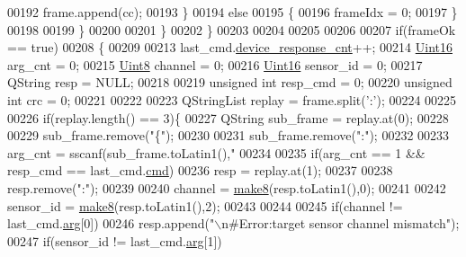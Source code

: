 \begin{DoxyCode}
{00192                                        frame.append(cc);
00193                                    \}
00194                                    \textcolor{keywordflow}{else}
00195                                    \{
00196                                        frameIdx = 0;
00197                                    \}
00198 
00199                       \}
00200 
00201                  \}
00202             \}
00203        
00204 
00205 
00206 
00207         \textcolor{keywordflow}{if}(frameOk == \textcolor{keyword}{true})
00208         \{
00209 
00213             last\_cmd.\hyperlink{a00001_a2b37e66e2555cf1dc26439ad7c30ea78}{device\_response\_cnt}++;
00214             \hyperlink{a00001_aae7407b021d43f7193a81a58cfb3e297}{Uint16}  arg\_cnt      =   0;
00215             \hyperlink{a00001_a979e3e23b9a449e69ab6a8a83b6042f8}{Uint8}   channel      =   0;
00216             \hyperlink{a00001_aae7407b021d43f7193a81a58cfb3e297}{Uint16}  sensor\_id    =   0;
00217             QString resp         =   NULL;
00218 
00219             \textcolor{keywordtype}{unsigned} \textcolor{keywordtype}{int}  resp\_cmd     =   0;
00220             \textcolor{keywordtype}{unsigned} \textcolor{keywordtype}{int}  crc          =   0;
00221 
00222 
00223           QStringList replay     = frame.split(\textcolor{charliteral}{':'});
00224 
00225 
00226           \textcolor{keywordflow}{if}(replay.length() == 3)\{
00227           QString     sub\_frame  = replay.at(0);
00228 
00229           sub\_frame.remove(\textcolor{stringliteral}{"\{"});
00230 
00231           sub\_frame.remove(\textcolor{stringliteral}{":"});
00232 
00233           arg\_cnt = sscanf(sub\_frame.toLatin1(),\textcolor{stringliteral}{"%
00234 
00235           \textcolor{keywordflow}{if}(arg\_cnt == 1 && resp\_cmd == last\_cmd.\hyperlink{a00001_af20664dc9ca2b752c73d524edee0e07a}{cmd})
00236               resp = replay.at(1);
00237 
00238           resp.remove(\textcolor{stringliteral}{":"});
00239 
00240           channel    = \hyperlink{a00006_aebce94d5e6af7afff661daf74b208de1}{make8}(resp.toLatin1(),0);
00241 
00242           sensor\_id  = \hyperlink{a00006_aebce94d5e6af7afff661daf74b208de1}{make8}(resp.toLatin1(),2);
00243 
00244 
00245           \textcolor{keywordflow}{if}(channel != last\_cmd.\hyperlink{a00001_a56e6c2d7315d0ae60a51e8b140c9cfe4}{arg}[0])
00246               resp.append(\textcolor{stringliteral}{"\(\backslash\)n#Error:target sensor channel mismatch"});
00247           \textcolor{keywordflow}{if}(sensor\_id != last\_cmd.\hyperlink{a00001_a56e6c2d7315d0ae60a51e8b140c9cfe4}{arg}[1])
}}
\end{DoxyCode}
